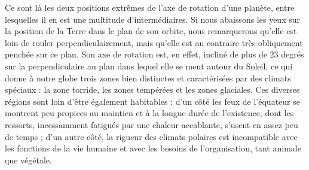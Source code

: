 \documentclass[a4paper, 11pt, oneside, landscape]{article}
\begin{document}
Ce sont là les deux positions extrêmes de l'axe de rotation d'une planète, entre lesquelles il en est une multitude d'intermédiaires. Si nous abaissons les yeux sur la position de la Terre dans le plan de son orbite, nous remarquerons qu'elle est loin de rouler perpendiculairement, mais qu'elle est au contraire très-obliquement penchée sur ce plan. Son axe de rotation est, en effet, incliné de plus de 23 degrés sur la perpendiculaire au plan dans lequel elle se meut autour du Soleil, ce qui donne à notre globe trois zones bien distinctes et caractérisées par des climats spéciaux : la zone torride, les zones tempérées et les zones glaciales. Ces diverses régions sont loin d'être également habitables : d'un côté les feux de l'équateur se montrent peu propices au maintien et à la longue durée de l'existence, dont les ressorts, incessamment fatigués par une chaleur accablante, s'usent en assez peu de temps ; d'un autre côté, la rigueur des climats polaires est incompatible avec les fonctions de la vie humaine et avec les besoins de l'organisation, tant animale que végétale.
\end{document}
